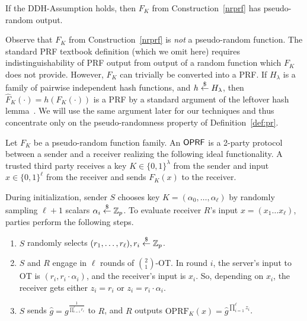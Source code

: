 \begin{theorem}
\label{theorem:naor} 
If the DDH-Assumption holds, then $F_K$ from Construction~\ref{nrprf}
has pseudo-random output.
\end{theorem}
Observe that $F_K$ from Construction~\ref{nrprf} is \emph{not} a
pseudo-random function. The standard PRF textbook definition (which we
omit here) requires indistinguishability of PRF output from output of
a random function which $F_K$ does not provide.  However, $F_K$ can
trivially be converted into a PRF. If $H_\lambda$ is a family of
pairwise independent hash functions, and $h\stackrel{\$}{\leftarrow}{}H_\lambda$, then
$\hat{F}_K(\cdot)=h(F_K(\cdot))$ is a PRF by a standard argument of
the leftover hash lemma~\cite{leftover}. We will use the same argument
later for our techniques and thus concentrate only on the
pseudo-randomness property of Definition~\ref{def:pr}.

\begin{definition}[$\oprf$]
  Let $F_K$ be a pseudo-random function family. An $\oprf$ is a
  2-party protocol between a sender and a receiver realizing the
  following ideal functionality.  A trusted third party receives a key
  $K\in\{0,1\}^\lambda$ from the sender and input $x\in\{0,1\}^\ell$
  from the receiver and sends $F_K(x)$ to the receiver.
\end{definition}

\begin{construction}
\label{ot-oprf}
  During initialization, sender $S$ chooses key
  $K=(\alpha_0,\ldots,\alpha_\ell)$ by randomly sampling $\ell+1$
  scalars $\alpha_i\stackrel{\$}{\leftarrow}\mathbb{Z}_p$.
  To evaluate receiver $R$'s input $x=(x_1\ldots{}x_\ell)$, parties perform the following steps.
  \begin{enumerate}
  \item $S$ randomly selects $(r_1,\ldots,r_\ell),r_i\stackrel{\$}{\leftarrow}\mathbb{Z}_p$.
  \item $S$ and $R$ engage in $\ell$ rounds of $\binom{2}{1}$-OT. In round
    $i$, the server's input to OT is $(r_i,r_i\cdot\alpha_i)$, and the
    receiver's input is $x_i$. So, depending on $x_i$, the receiver gets either $z_i=r_i$ or $z_i=r_i\cdot{}\alpha_i$.
  \item $S$ sends $\hat{g}=g^{\frac{1}{\prod_{i=1}^{\ell}r_i}}$ to $R$, and
    $R$ outputs $\text{OPRF}_K(x)=\hat{g}^{\prod^{\ell}_{i=1}z_i}$.
    
    \end{enumerate}
\end{construction}

